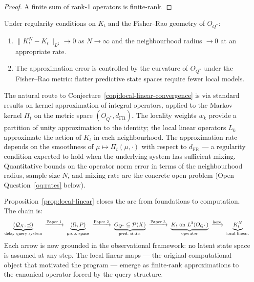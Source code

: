 \begin{proof}
A finite sum of rank-1 operators is finite-rank.
\end{proof}

\begin{conjecture}
\label{conj:local-linear-convergence}
Under regularity conditions on $K_t$ and the Fisher--Rao geometry of
$O_{Q^*}$:
\begin{enumerate}
  \item $\|K_t^N - K_t\|_{L^2} \to 0$ as $N \to \infty$ and the
    neighbourhood radius $\to 0$ at an appropriate rate.
  \item The approximation error is controlled by the curvature of
    $O_{Q^*}$ under the Fisher--Rao metric: flatter predictive state
    spaces require fewer local models.
\end{enumerate}
\end{conjecture}

\begin{remark}
The natural route to Conjecture~\ref{conj:local-linear-convergence} is
via standard results on kernel approximation of integral operators,
applied to the Markov kernel $\Pi_t$ on the metric space
$(O_{Q^*}, d_{\mathrm{FR}})$.  The locality weights $w_k$ provide a
partition of unity approximation to the identity; the local linear
operators $L_k$ approximate the action of $K_t$ in each neighbourhood.
The approximation rate depends on the smoothness of
$\mu \mapsto \Pi_t(\mu, \cdot)$ with respect to $d_{\mathrm{FR}}$ ---
a regularity condition expected to hold when the underlying system has
sufficient mixing.  Quantitative bounds on the operator norm error in
terms of the neighbourhood radius, sample size $N$, and mixing rate
are the concrete open problem (Open Question~\ref{oq:rates} below).
\end{remark}

\begin{remark}
Proposition~\ref{prop:local-linear} closes the arc from foundations to
computation.  The chain is:
\[
  \underbrace{(\mathcal{Q}_X, \preceq)}_{\text{delay query system}}
  \;\xrightarrow{\text{Paper~1}}\;
  \underbrace{(\Omega, P)}_{\text{prob.\ space}}
  \;\xrightarrow{\text{Paper~2}}\;
  \underbrace{O_{Q^*} \subseteq \mathcal{P}(X)}_{\text{pred.\ states}}
  \;\xrightarrow{\text{Paper~3}}\;
  \underbrace{K_t \text{ on } L^2(O_{Q^*})}_{\text{operator}}
  \;\xrightarrow{\text{here}}\;
  \underbrace{K_t^N}_{\text{local linear.}}
\]
Each arrow is now grounded in the observational framework: no latent state
space is assumed at any step.  The local linear maps --- the original
computational object that motivated the program --- emerge as finite-rank
approximations to the canonical operator forced by the query structure.
\end{remark}

